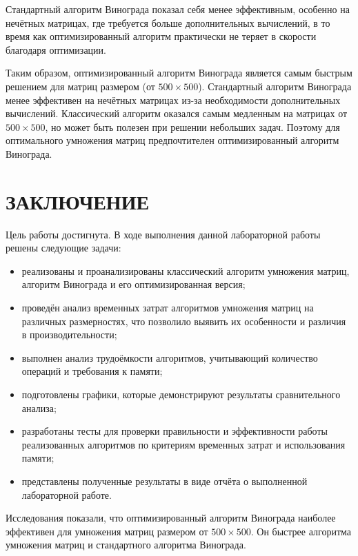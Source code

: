 \documentclass[a4paper, 12pt]{extreport}
\begin{document}
Стандартный алгоритм Винограда показал себя менее эффективным, особенно на нечётных матрицах, где требуется больше дополнительных вычислений, в то время как оптимизированный алгоритм практически не теряет в скорости благодаря оптимизации.

Таким образом, оптимизированный алгоритм Винограда является самым быстрым решением для матриц размером (от $500 \times 500$). Стандартный алгоритм Винограда менее эффективен на нечётных матрицах из-за необходимости дополнительных вычислений. Классический алгоритм оказался самым медленным на матрицах от $500 \times 500$, но может быть полезен при решении небольших задач. Поэтому для оптимального умножения матриц предпочтителен оптимизированный алгоритм Винограда.
\clearpage


\chapter*{ЗАКЛЮЧЕНИЕ}
Цель работы достигнута. В ходе выполнения данной лабораторной работы решены следующие задачи:
\begin{itemize}
    \item[--] реализованы и проанализированы классический алгоритм умножения матриц, алгоритм Винограда и его оптимизированная версия;
    \item[--] проведён анализ временных затрат алгоритмов умножения матриц на различных размерностях, что позволило выявить их особенности и различия в производительности;
    \item[--] выполнен анализ трудоёмкости алгоритмов, учитывающий количество операций и требования к памяти;
    \item[--] подготовлены графики, которые демонстрируют результаты сравнительного анализа;
    \item[--] разработаны тесты для проверки правильности и эффективности работы реализованных алгоритмов по критериям временных затрат и использования памяти;
    \item[--] представлены полученные результаты в виде отчёта о выполненной лабораторной работе.
\end{itemize}

Исследования показали, что оптимизированный алгоритм Винограда наиболее эффективен для умножения матриц размером от $500 \times 500$. Он быстрее алгоритма умножения матриц и стандартного алгоритма Винограда.
\end{document}

